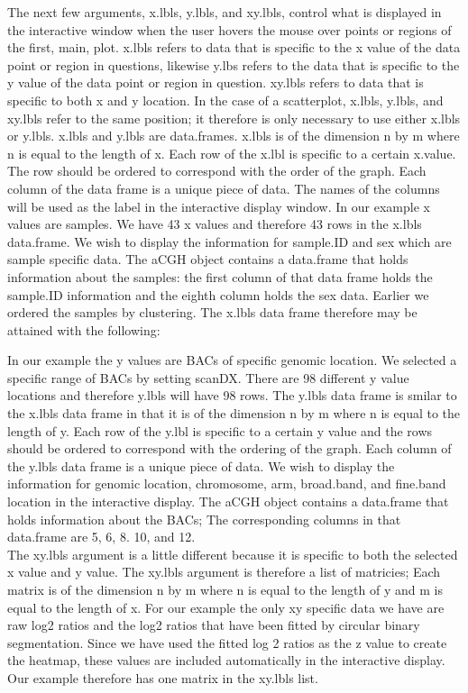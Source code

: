 \documentclass[]{article}
\begin{document}
\quad The next few arguments, x.lbls, y.lbls, and xy.lbls, control what is displayed in the interactive window when the user hovers the mouse over points or regions of the first, main, plot. x.lbls refers to data that is specific to the x value of the data point or region in questions, likewise y.lbs refers to the data that is specific to the y value of the data point or region in question. xy.lbls refers to data that is specific to both x and y location. In the case of a scatterplot, x.lbls, y.lbls, and xy.lbls refer to the same position; it therefore is only necessary to use either x.lbls or y.lbls. x.lbls and y.lbls are data.frames. x.lbls is of the dimension n by m where n is equal to the length of x. Each row of the x.lbl is specific to a certain x.value. The row should be ordered to correspond with the order of the graph. Each column of the data frame is a unique piece of data. The names of the columns will be used as the label in the interactive display window. In our example x values are samples. We have 43 x values and therefore 43 rows in the x.lbls data.frame. We wish to display the information for sample.ID and sex which are sample specific data. The aCGH object contains a data.frame that holds information about the samples: the first column of that data frame holds the sample.ID information and the eighth column holds the sex data. Earlier we ordered the samples by clustering. The x.lbls data frame therefore may be attained with the following:

\begin{Schunk}
\end{Schunk}
\quad In our example the y values are BACs of specific genomic location. We selected a specific range of BACs by setting scanDX. There are 98 different y value locations and therefore y.lbls will have 98 rows. The y.lbls data frame is smilar to the x.lbls data frame in that it is of the dimension n by m where n is equal to the length of y. Each row of the y.lbl is specific to a certain y value and the rows should be ordered to correspond with the ordering of the graph. Each column of the y.lbls data frame is a unique piece of data. We wish to display the information for genomic location, chromosome, arm, broad.band, and fine.band location in the interactive display. The aCGH object contains a data.frame that holds information about the BACs; The corresponding columns in that data.frame are 5, 6, 8. 10, and 12. \\
\quad The xy.lbls argument is a little different because it is specific to both the selected x value and y value. The xy.lbls argument is therefore a list of matricies; Each matrix is of the dimension n by m where n is equal to the length of y and m is equal to the length of x. For our example the only xy specific data we have are raw log2 ratios and the log2 ratios that have been fitted by circular binary segmentation. Since we have used the fitted log 2 ratios as the z value to create the heatmap, these values are included automatically in the interactive display. Our example therefore has one matrix in the xy.lbls list. 
\end{document}
